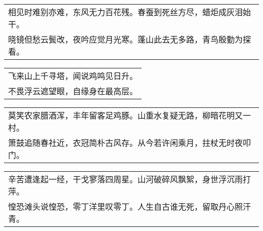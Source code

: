 \noindent\begin{minipage}{\linewidth}
  \vskip-3pt\begin{table}[H]
    \centering
    \begin{tabular}{@{}l@{}}
相见时难别亦难，东风无力百花残。春蚕到死丝方尽，蜡炬成灰泪始干。\\
晓镜但愁云鬓改，夜吟应觉月光寒。蓬山此去无多路，青鸟殷勤为探看。
    \end{tabular}
  \end{table}
\end{minipage}
\vspace{1cm}


\noindent\begin{minipage}{\linewidth}
  \vskip-3pt\begin{table}[H]
    \centering
    \begin{tabular}{@{}l@{}}
飞来山上千寻塔，闻说鸡鸣见日升。\\
不畏浮云遮望眼，自缘身在最高层。
    \end{tabular}
  \end{table}
\end{minipage}
\vspace{1cm}


\noindent\begin{minipage}{\linewidth}
  \vskip-3pt\begin{table}[H]
    \centering
    \begin{tabular}{@{}l@{}}
莫笑农家腊酒浑，丰年留客足鸡豚。山重水复疑无路，柳暗花明又一村。\\
箫鼓追随春社近，衣冠简朴古风存。从今若许闲乘月，拄杖无时夜叩门。
    \end{tabular}
  \end{table}
\end{minipage}
\vspace{1cm}


\noindent\begin{minipage}{\linewidth}
  \vskip-3pt\begin{table}[H]
    \centering
    \begin{tabular}{@{}l@{}}
辛苦遭逢起一经，干戈寥落四周星。山河破碎风飘絮，身世浮沉雨打萍。\\
惶恐滩头说惶恐，零丁洋里叹零丁。人生自古谁无死，留取丹心照汗青。
    \end{tabular}
  \end{table}
\end{minipage}
\vspace{1cm}



